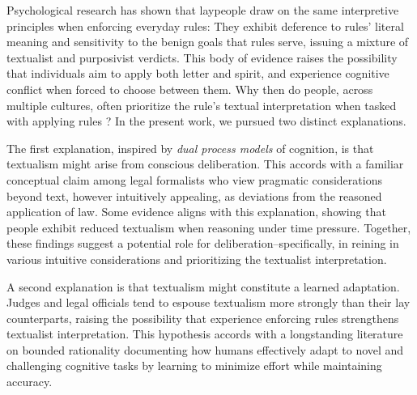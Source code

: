 \documentclass[pdflatex,sn-nature]{sn-jnl}
\begin{document}
Psychological research has shown that laypeople draw on the same interpretive principles when enforcing everyday rules: They exhibit deference to rules' literal meaning\cite{ref3} and sensitivity to the benign goals that rules serve\cite{ref4,ref5}, issuing a mixture of textualist and purposivist verdicts\cite{ref6}. This body of evidence raises the possibility that individuals aim to apply both letter and spirit, and experience cognitive conflict when forced to choose between them. Why then do people, across multiple cultures, often prioritize the rule's textual interpretation when tasked with applying rules \cite{ref40}? In the present work, we pursued two distinct explanations.

The first explanation, inspired by \textit{dual process models} of cognition, is that textualism might arise from conscious deliberation. This accords with a familiar conceptual claim among legal formalists who view pragmatic considerations beyond text, however intuitively appealing, as deviations from the reasoned application of law\cite{scalia1997matter}. Some evidence aligns with this explanation, showing that people exhibit reduced textualism when reasoning under time pressure\cite{ref4}. Together, these findings suggest a potential role for deliberation--specifically, in reining in various intuitive considerations and prioritizing the textualist interpretation.

A second explanation is that textualism might constitute a learned adaptation. Judges and legal officials tend to espouse textualism more strongly than their lay counterparts\cite{ref8}, raising the possibility that experience enforcing rules strengthens textualist interpretation. This hypothesis accords with a longstanding literature on bounded rationality documenting how humans effectively adapt to novel and challenging cognitive tasks by learning to minimize effort while maintaining accuracy\cite{ref9,ref10,ref11}.
\end{document}
